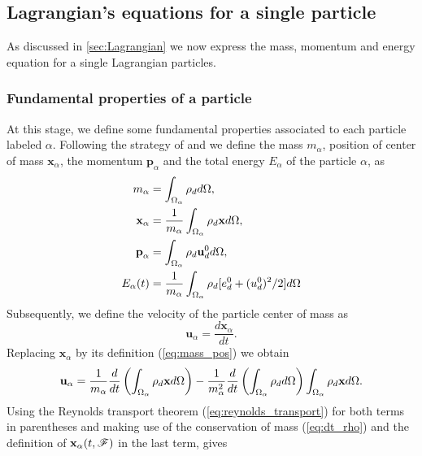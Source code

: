 \subsection{Lagrangian's equations for a single particle}
\label{ap:particles_eq}

As discussed in \ref{sec:Lagrangian} we now express the mass, momentum and energy equation for a single Lagrangian particles. 

\subsubsection{Fundamental properties of a particle}

At this stage, we define some fundamental properties associated to each particle labeled $\alpha$.
Following the strategy of \citet{lhuillier2009rheology,lhuillier1992volume,zaepffel2011modelisation} and \citet[Chapter 2]{morel2015mathematical}
we define the mass $m_\alpha$, position of center of mass $\mathbf{x}_\alpha$, the momentum $\textbf{p}_\alpha$ and the total energy $E_\alpha$ of the particle $\alpha$, as
\begin{align}
    m_\alpha
    &= \int_{\Omega_{\alpha}}  \rho_d   d\Omega, 
    \\
    \textbf{x}_\alpha
    &= \frac{1}{m_\alpha }\int_{\Omega_{\alpha}}  \rho_d \textbf{x}  d\Omega, 
    \\\textbf{p}_\alpha 
    &= \int_{\Omega_{\alpha}}  \rho_d \textbf{u}_d^0  d\Omega,
    \label{eq:mass_pos}
    \\
    E_\alpha(t) 
    &=\frac{1}{m_\alpha} 
    \int_{\Omega_{\alpha}}  \rho_d [e_d^0 + (u_d^0)^2/2]  d\Omega
\end{align}
Subsequently, we define the velocity of the particle center of mass as
\begin{equation*}
\textbf{u}_\alpha = \frac{d \textbf{x}_\alpha}{dt}.
\end{equation*}
Replacing $\textbf{x}_\alpha$ by its definition (\ref{eq:mass_pos}) we obtain
\begin{equation*}
    \textbf{u}_\alpha = \frac{1}{m_\alpha}
    \frac{d}{dt} 
    \left(
        \int_{\Omega_{\alpha}}  \rho_d \textbf{x}  d\Omega
    \right)
    - \frac{1}{m_\alpha^2} \frac{d}{dt} \left(\int_{\Omega_{\alpha}}  \rho_d  d\Omega \right)
    \int_{\Omega_{\alpha}}  \rho_d \textbf{x}  d\Omega.
\end{equation*}
Using the Reynolds transport theorem (\ref{eq:reynolds_transport}) for both terms in parentheses and making use of the conservation of mass (\ref{eq:dt_rho}) and the definition of $\textbf{x}_\alpha(t,\mathscr{F})$ in the last term, gives

